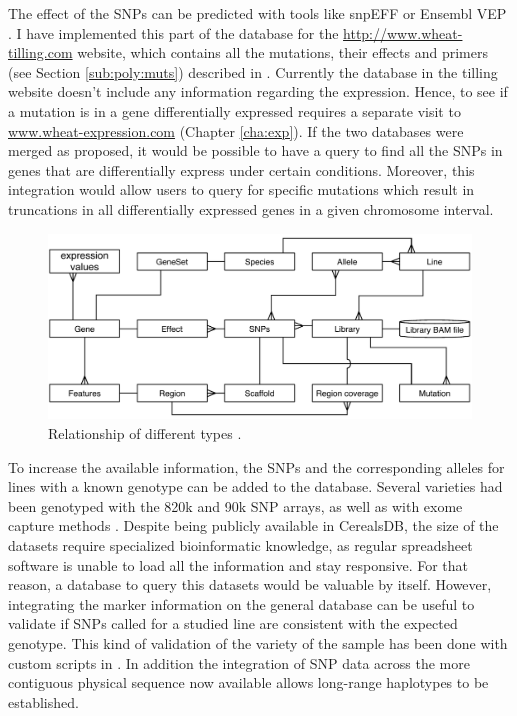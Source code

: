 The effect of the SNPs can be predicted with tools like snpEFF \citep{Cingolani2012} or Ensembl VEP \citep{Mclaren2016}. 
I have implemented this part of the database for the \url{http://www.wheat-tilling.com} website, which contains all the mutations, their effects and primers (see Section \ref{sub:poly:muts}) described in \citet{Krasileva2016}. 
Currently the database in the tilling website doesn't include any information regarding the expression. 
Hence, to see if a mutation is in a gene differentially expressed requires a separate visit to \url{www.wheat-expression.com} (Chapter \ref{cha:exp}). 
If the two databases were merged as proposed, it would be possible to have a query to find all the SNPs in genes that are differentially express under certain conditions.
Moreover, this integration would allow users to query for specific mutations which result in truncations in all differentially expressed genes in a given chromosome interval.  

\begin{figure}
\includegraphics[width=1\textwidth]{Conclusions/Figures/IntegratingExperiments.pdf}
\caption{Relationship of different types .}
\label{fig:discussion:sequencingExperimentsTables}
\end{figure}

To increase the available information, the SNPs and the corresponding alleles for lines with a known genotype  can be added to the database. 
Several varieties had been genotyped with the 820k \citep{Winfield2016} and 90k \citep{Wang2014} SNP arrays, as well as with exome capture methods \citep{Jordan2015}.
Despite being publicly available in CerealsDB, the size of the datasets require specialized bioinformatic knowledge, as regular spreadsheet software is unable to load all the information and stay responsive. 
For that reason, a database to query this datasets would be valuable by itself. 
However, integrating the marker information on the general database can be useful to validate if SNPs called for a studied line are consistent with the expected genotype. 
This kind of validation of the variety of the sample has been done with custom scripts in \citep{Hubbard2015}.
In addition the integration of SNP data across the more contiguous physical sequence now available allows long-range haplotypes to be established. 

